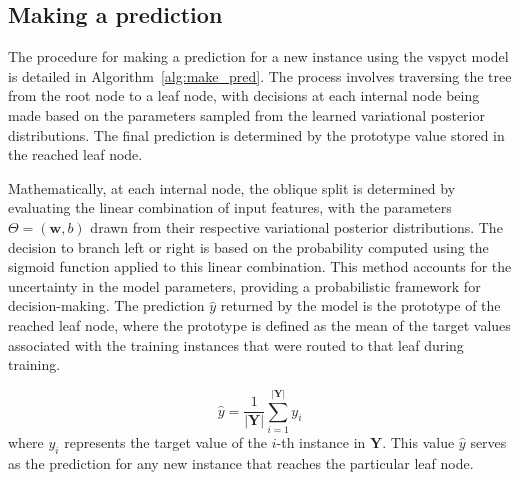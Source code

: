 \documentclass[3p,review,authoryear]{elsarticle}
\begin{document}
\subsection{Making a prediction}

The procedure for making a prediction for a new instance using the \gls{vspyct} model is detailed in Algorithm~\ref{alg:make_pred}.
The process involves traversing the tree from the root node to a leaf node, with decisions at each internal node being made based on the parameters sampled from the learned variational posterior distributions.
The final prediction is determined by the prototype value stored in the reached leaf node.

Mathematically, at each internal node, the oblique split is determined by evaluating the linear combination of input features, with the parameters \(\Theta = (\mathbf{w}, b)\) drawn from their respective variational posterior distributions. The decision to branch left or right is based on the probability computed using the sigmoid function applied to this linear combination. This method accounts for the uncertainty in the model parameters, providing a probabilistic framework for decision-making.
The prediction \(\hat{y}\) returned by the model is the prototype of the reached leaf node, where the prototype is defined as the mean of the target values associated with the training instances that were routed to that leaf during training.


\begin{equation}
\hat{y} = \frac{1}{|\mathbf{Y}|} \sum_{i=1}^{|\mathbf{Y}|} y_i
\end{equation}
where \( y_i \) represents the target value of the \(i\)-th instance in \(\mathbf{Y}\).
This value $\hat{y}$ serves as the prediction for any new instance that reaches the particular leaf node.
\end{document}
